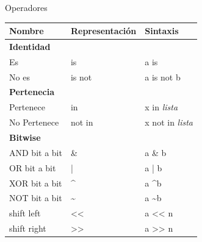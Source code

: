 \documentclass[11pt]{beamer}
\begin{document}
\begin{frame}{Operadores}
	\begin{longtable}{p{4cm}p{3cm}p{7cm}}
		\toprule
		\textbf{Nombre} & \textbf{Representación} & \textbf{Sintaxis} \\
		\midrule
		\textbf{Identidad} \\
		Es & is & a is \\
		No es & is not & a is not b \\
		\midrule
		\textbf{Pertenecia} \\
		Pertenece & in & x in \textit{lista} \\
		No Pertenece & not in & x not in \textit{lista} \\
		\midrule
		\textbf{Bitwise} \\
		AND bit a bit & \& & a \& b \\
		OR bit a bit & | & a | b \\
		XOR bit a bit & \textasciicircum & a \textasciicircum b \\
		NOT bit a bit & \textasciitilde & a \textasciitilde b \\
		shift left & << & a << n \\
		shift right & >> & a >> n \\			
		\bottomrule
	\end{longtable}
\end{frame}			
	
\end{document}
